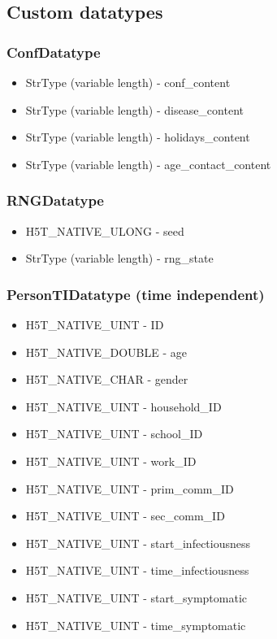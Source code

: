 \documentclass{article}
\begin{document}
		\subsection{Custom datatypes}
			\subsubsection{ConfDatatype}
				\begin{itemize}
					\item StrType (variable length) - conf\_content
					\item StrType (variable length) - disease\_content
					\item StrType (variable length) - holidays\_content
					\item StrType (variable length) - age\_contact\_content
				\end{itemize}

			\subsubsection{RNGDatatype}
				\begin{itemize}
					\item H5T\_NATIVE\_ULONG - seed
					\item StrType (variable length) - rng\_state
				\end{itemize}

			\subsubsection{PersonTIDatatype (time independent)}
				\begin{itemize}
					\item H5T\_NATIVE\_UINT - ID
					\item H5T\_NATIVE\_DOUBLE - age
					\item H5T\_NATIVE\_CHAR - gender

					\item H5T\_NATIVE\_UINT - household\_ID
					\item H5T\_NATIVE\_UINT - school\_ID
					\item H5T\_NATIVE\_UINT - work\_ID
					\item H5T\_NATIVE\_UINT - prim\_comm\_ID
					\item H5T\_NATIVE\_UINT - sec\_comm\_ID

					\item H5T\_NATIVE\_UINT - start\_infectiousness
					\item H5T\_NATIVE\_UINT - time\_infectiousness
					\item H5T\_NATIVE\_UINT - start\_symptomatic
					\item H5T\_NATIVE\_UINT - time\_symptomatic
				\end{itemize}
\end{document}

